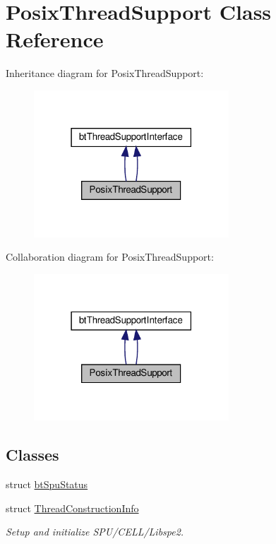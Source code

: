 \hypertarget{classPosixThreadSupport}{}\section{Posix\+Thread\+Support Class Reference}
\label{classPosixThreadSupport}


Inheritance diagram for Posix\+Thread\+Support\+:
\nopagebreak
\begin{figure}[H]
\begin{center}
\leavevmode
\includegraphics[width=207pt]{classPosixThreadSupport__inherit__graph}
\end{center}
\end{figure}


Collaboration diagram for Posix\+Thread\+Support\+:
\nopagebreak
\begin{figure}[H]
\begin{center}
\leavevmode
\includegraphics[width=207pt]{classPosixThreadSupport__coll__graph}
\end{center}
\end{figure}
\subsection*{Classes}
\begin{DoxyCompactItemize}
\item 
struct \hyperlink{structPosixThreadSupport_1_1btSpuStatus}{bt\+Spu\+Status}
\item 
struct \hyperlink{structPosixThreadSupport_1_1ThreadConstructionInfo}{Thread\+Construction\+Info}
\begin{DoxyCompactList}\small\item\em Setup and initialize S\+P\+U/\+C\+E\+L\+L/\+Libspe2. \end{DoxyCompactList}\end{DoxyCompactItemize}
